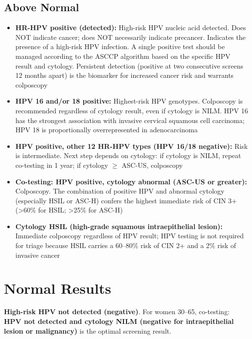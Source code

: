 \subsection*{Above Normal}
\begin{itemize}
  \item \textbf{HR-HPV positive (detected):} High-risk HPV nucleic acid detected. Does NOT indicate cancer; does NOT necessarily indicate precancer. Indicates the presence of a high-risk HPV infection. A single positive test should be managed according to the ASCCP algorithm based on the specific HPV result and cytology. Persistent detection (positive at two consecutive screens 12 months apart) is the biomarker for increased cancer risk and warrants colposcopy
  \item \textbf{HPV 16 and/or 18 positive:} Highest-risk HPV genotypes. Colposcopy is recommended regardless of cytology result, even if cytology is NILM. HPV 16 has the strongest association with invasive cervical squamous cell carcinoma; HPV 18 is proportionally overrepresented in adenocarcinoma
  \item \textbf{HPV positive, other 12 HR-HPV types (HPV 16/18 negative):} Risk is intermediate. Next step depends on cytology: if cytology is NILM, repeat co-testing in 1 year; if cytology $\geq$ ASC-US, colposcopy
  \item \textbf{Co-testing: HPV positive, cytology abnormal (ASC-US or greater):} Colposcopy. The combination of positive HPV and abnormal cytology (especially HSIL or ASC-H) confers the highest immediate risk of CIN 3+ (>60\% for HSIL; >25\% for ASC-H)
  \item \textbf{Cytology HSIL (high-grade squamous intraepithelial lesion):} Immediate colposcopy regardless of HPV result; HPV testing is not required for triage because HSIL carries a 60--80\% risk of CIN 2+ and a 2\% risk of invasive cancer
\end{itemize}

\section*{Normal Results}
\textbf{High-risk HPV not detected (negative)}. For women 30--65, co-testing: \textbf{HPV not detected and cytology NILM (negative for intraepithelial lesion or malignancy)} is the optimal screening result.

